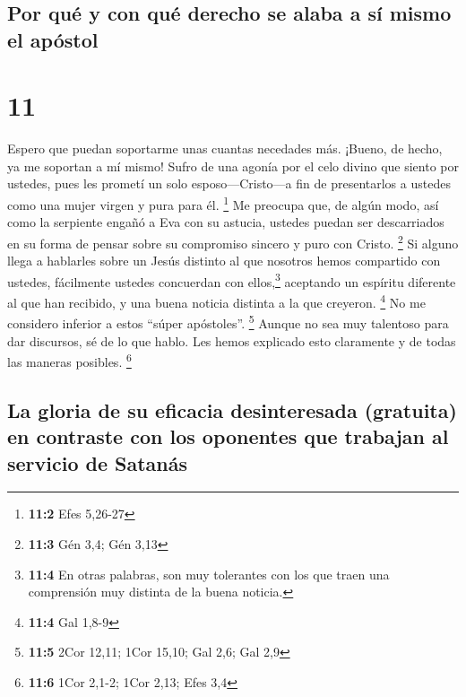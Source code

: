 \hypertarget{por-quuxe9-y-con-quuxe9-derecho-se-alaba-a-suxed-mismo-el-apuxf3stol}{%
\subsection{Por qué y con qué derecho se alaba a sí mismo el
apóstol}\label{por-quuxe9-y-con-quuxe9-derecho-se-alaba-a-suxed-mismo-el-apuxf3stol}}

\hypertarget{section-10}{%
\section{11}\label{section-10}}

 Espero que puedan soportarme unas cuantas necedades más.
¡Bueno, de hecho, ya me soportan a mí mismo!  Sufro de una
agonía por el celo divino que siento por ustedes, pues les prometí un
solo esposo---Cristo---a fin de presentarlos a ustedes como una mujer
virgen y pura para él. \footnote{\textbf{11:2} Efes 5,26-27}
 Me preocupa que, de algún modo, así como la serpiente
engañó a Eva con su astucia, ustedes puedan ser descarriados en su forma
de pensar sobre su compromiso sincero y puro con Cristo. \footnote{\textbf{11:3}
  Gén 3,4; Gén 3,13}  Si alguno llega a hablarles sobre un
Jesús distinto al que nosotros hemos compartido con ustedes, fácilmente
ustedes concuerdan con ellos,\footnote{\textbf{11:4} En otras palabras,
  son muy tolerantes con los que traen una comprensión muy distinta de
  la buena noticia.} aceptando un espíritu diferente al que han
recibido, y una buena noticia distinta a la que creyeron. \footnote{\textbf{11:4}
  Gal 1,8-9}  No me considero inferior a estos ``súper
apóstoles''. \footnote{\textbf{11:5} 2Cor 12,11; 1Cor 15,10; Gal 2,6;
  Gal 2,9}  Aunque no sea muy talentoso para dar
discursos, sé de lo que hablo. Les hemos explicado esto claramente y de
todas las maneras posibles. \footnote{\textbf{11:6} 1Cor 2,1-2; 1Cor
  2,13; Efes 3,4}

\hypertarget{la-gloria-de-su-eficacia-desinteresada-gratuita-en-contraste-con-los-oponentes-que-trabajan-al-servicio-de-satanuxe1s}{%
\subsection{La gloria de su eficacia desinteresada (gratuita) en
contraste con los oponentes que trabajan al servicio de
Satanás}\label{la-gloria-de-su-eficacia-desinteresada-gratuita-en-contraste-con-los-oponentes-que-trabajan-al-servicio-de-satanuxe1s}}

